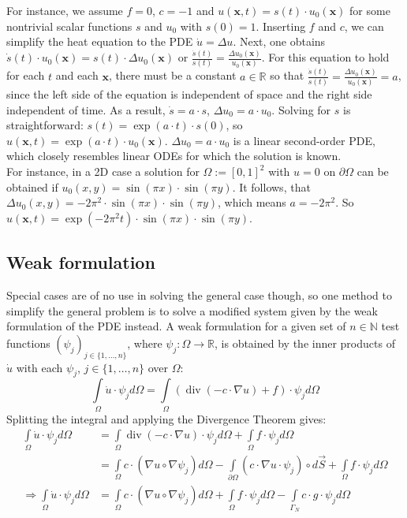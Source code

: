 \documentclass{IOS-Book-Article}
\theoremstyle{plain}
\theoremstyle{definition}
\DeclareMathOperator{\diverg}{div}
\begin{document}
For instance, we assume $f = 0$, $c = -1$ and $u(\mathbf x, t) = s(t) \cdot u_0(\mathbf x)$ for some nontrivial scalar functions $s$ and $u_0$ with $s(0) = 1$. Inserting $f$ and $c$, we can simplify the heat equation to the PDE $\dot u = \Delta u$.
Next, one obtains $\dot s(t) \cdot u_0(\mathbf x) = s(t) \cdot \Delta u_0(\mathbf x)$ or $\frac{\dot s(t)}{s(t)} = \frac{\Delta u_0(\mathbf x)}{u_0(\mathbf x)}$. For this equation to hold for each $t$ and each $\mathbf x$, there must be a constant $a \in \mathbb{R}$ so that $\frac{\dot s(t)}{s(t)} = \frac{\Delta u_0(\mathbf x)}{u_0(\mathbf x)} = a$, since the left side of the equation is independent of space and the right side independent of time. As a result, $\dot s = a \cdot s$, $\Delta u_0 = a \cdot u_0$. Solving for $s$ is straightforward:
$s(t) = \exp(a \cdot t) \cdot s(0)$, so $u(\mathbf x, t) = \exp(a \cdot t) \cdot u_0(\mathbf x)$. $\Delta u_0 = a \cdot u_0$ is a linear second-order PDE, which closely resembles linear ODEs for which the solution is known.\\
For instance, in a 2D case a solution for $\Omega := [0, 1]^2$ with $u = 0$ on $\partial \Omega$ can be obtained if $u_0(x, y) = \sin(\pi x) \cdot \sin(\pi y)$. It follows, that $\Delta u_0(x, y) = -2 \pi^2 \cdot \sin(\pi x) \cdot \sin(\pi y)$, which means $a = -2 \pi^2$. So $u(\mathbf x, t) = \exp(-2 \pi^2 t) \cdot \sin(\pi x) \cdot \sin(\pi y)$.

\subsection{Weak formulation}

Special cases are of no use in solving the general case though, so one method to simplify the general problem is to solve a modified system given by the weak formulation of the PDE instead.
A weak formulation for a given set of $n \in \mathbb{N}$ test functions $(\psi_j)_{j \in \{1, \dots , n\}}$, where $\psi_j : \Omega \rightarrow \mathbb{R}$, is obtained by the inner products of $\dot u$ with each $\psi_j$, $j \in \{1, \dots , n\}$ over $\Omega$:
\begin{equation}
	\int \limits_{\Omega} \dot u \cdot \psi_j d\Omega = \int \limits_{\Omega} \left( \diverg (- c \cdot \nabla u) + f \right) \cdot \psi_j d\Omega
\end{equation}
Splitting the integral and applying the Divergence Theorem gives:
\begin{align}
	\int \limits_{\Omega} \dot u \cdot \psi_j d\Omega &= \int \limits_{\Omega} \diverg (- c \cdot \nabla u) \cdot \psi_j d\Omega + \int \limits_{\Omega} f \cdot \psi_j d\Omega \\
	&= \int \limits_{\Omega} c \cdot (\nabla u \circ \nabla \psi_j ) d\Omega - \int \limits_{\partial \Omega} (c \cdot \nabla u \cdot \psi_j) \circ d \vec{S} + \int \limits_{\Omega} f \cdot \psi_j d\Omega \\
	\Rightarrow \int \limits_{\Omega} \dot u \cdot \psi_j d\Omega &= \int \limits_{\Omega} c \cdot ( \nabla u \circ \nabla \psi_j ) d\Omega + \int \limits_{\Omega} f \cdot \psi_j d\Omega - \int \limits_{\Gamma_N} c \cdot g \cdot \psi_j d\Omega
	\label{eqn:heq_weak_form}
\end{align}
\end{document}

